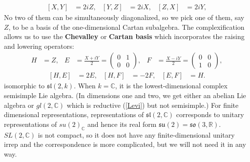 \documentclass[aps,nofootinbib]{revtex4}
\begin{document}
\begin{enumerate}
\begin{align}
\left[X,Y\right] & =2iZ,&
\left[Y,Z\right] & =2iX,&
\left[Z,X\right] & =2iY,
\end{align}
No two of them can be simultaneously diagonalized, so we pick one of
them, say $Z$, to be a basis of the one-dimensional Cartan subalgebra.
The complexification allows us to use the {\bf Chevalley} or {\bf Cartan basis} which incorporates the raising and lowering operators:
\begin{align*}
H & =Z,&
E & =\frac{X+iY}{2} = \left(\begin{array}{cc}
0 & 1\\
0 & 0
\end{array}\right),&
F & =\frac{X-iY}{2} = \left(\begin{array}{cc}
0 & 0\\
1 & 0
\end{array}\right),
\end{align*}
\begin{align*}
\left[H,E\right] & =2E,&
\left[H,F\right] & =-2F,&
\left[E,F\right] & =H.
\end{align*}
isomorphic to $\mathfrak{sl}(2,k)$. When $k=\mathbb{C}$, it is the lowest-dimensional complex semisimple Lie algebra. (In dimensions one and two, we get either an abelian Lie algebra or $gl(2,\mathbb{C})$ which is reductive (\ref{Levi}) but not semisimple.) For finite dimensional representations, representations of $\mathfrak{sl}(2,\mathbb{C})$ corresponds to unitary representations of $su(2)_{\mathbb{C}}$ and hence its real form $\mathfrak{su}(2)=\mathfrak{so}(3,\mathbb{R})$. $SL(2,\mathbb{C})$ is not compact, so it does not have any finite-dimensional unitary irrep and the correspondence is more complicated, but we will not need it in any way.


\end{enumerate}
\end{document}
